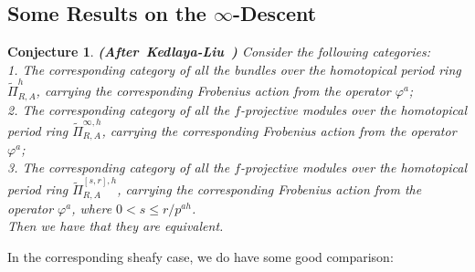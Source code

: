 \documentclass[12pt]{amsart}
\newtheorem{conjecture}[theorem]{Conjecture}
\theoremstyle{definition}
\numberwithin{equation}{section}
\begin{document}
\subsection{Some Results on the $\infty$-Descent}



\begin{conjecture} \mbox{\bf{(After Kedlaya-Liu \cite[Theorem 4.6.1]{KL2})}}
Consider the following categories:\\
1. The corresponding category of all the bundles over the homotopical period ring $\widetilde{\Pi}^h_{R,A}$, carrying the corresponding Frobenius action from the operator $\varphi^a$;\\
2. The corresponding category of all the $f$-projective modules over the homotopical period ring $\widetilde{\Pi}^{\infty,h}_{R,A}$, carrying the corresponding Frobenius action from the operator $\varphi^a$;\\
3. The corresponding category of all the $f$-projective modules over the homotopical period ring $\widetilde{\Pi}^{[s,r],h}_{R,A}$, carrying the corresponding Frobenius action from the operator $\varphi^a$, where $0<s\leq r/p^{ah}$.\\
Then we have that they are equivalent.
\end{conjecture}


\indent In the corresponding sheafy case, we do have some good comparison:
\end{document}
